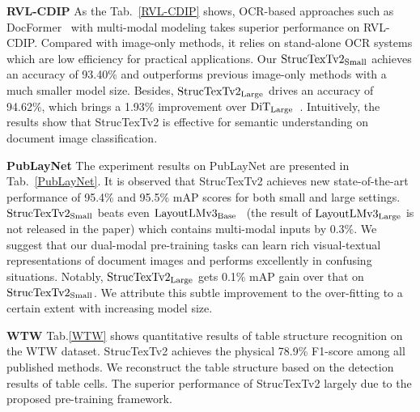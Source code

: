 \documentclass{article} %
\begin{document}
\noindent\textbf{RVL-CDIP} As the Tab.~\ref{RVL-CDIP} shows, OCR-based approaches such as DocFormer~\cite{appalaraju2021docformer} with multi-modal modeling takes superior performance on RVL-CDIP. Compared with image-only methods, it relies on stand-alone OCR systems which are low efficiency for practical applications. Our $\rm StrucTexTv2_{Small}$ achieves an accuracy of 93.40\% and outperforms previous image-only methods with a much smaller model size. Besides, $\rm StrucTexTv2_{Large}$ drives an accuracy of 94.62\%, which brings a 1.93\% improvement over $\rm DiT_{Large}$~\cite{li2022dit}. Intuitively, the results show that StrucTexTv2 is effective for semantic understanding on document image classification.

\noindent\textbf{PubLayNet} The experiment results on PubLayNet are presented in Tab.~\ref{PubLayNet}. 
It is observed that StrucTexTv2 achieves new state-of-the-art performance of 95.4\% and 95.5\% mAP scores for both small and large settings. $\rm StrucTexTv2_{Small}$ beats even $\rm LayoutLMv3_{Base}$~\cite{huang2022layoutlmv3} (the result of $\rm LayoutLMv3_{Large}$ is not released in the paper) which contains multi-modal inputs by 0.3\%. We suggest that our dual-modal pre-training tasks can learn rich visual-textual representations of document images and performs excellently in confusing situations. Notably, $\rm StrucTexTv2_{Large}$
gets 0.1\% mAP gain over that on $\rm StrucTexTv2_{Small}$. We attribute this subtle improvement to the over-fitting to a certain extent with increasing model size.

\noindent\textbf{WTW} Tab.\ref{WTW} shows quantitative results of table structure recognition on the WTW dataset. StrucTexTv2 achieves the physical 78.9\% F1-score among all published methods. We reconstruct the table structure based on the detection results of table cells. The superior performance of StrucTexTv2 largely due to the proposed pre-training framework.
\end{document}
